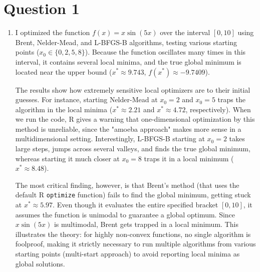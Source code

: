 \documentclass[11pt]{article}
\numberwithin{equation}{section}
\numberwithin{figure}{section}
\begin{document}
\section*{Question 1}
\begin{enumerate}
    \item[a-b)] I optimized the function $f(x) = x \sin(5x)$ over the interval $[0,10]$ using Brent, Nelder-Mead, and L-BFGS-B algorithms, testing various starting points ($x_0 \in \{0, 2, 5, 8\}$). Because the function oscillates many times in this interval, it contains several local minima, and the true global minimum is located near the upper bound ($x^* \approx 9.743$, $f(x^*) \approx -9.7409$). 
    
    The results show how extremely sensitive local optimizers are to their initial guesses. For instance, starting Nelder-Mead at $x_0=2$ and $x_0=5$ traps the algorithm in the local minima ($x^* \approx 2.21$ and $x^* \approx 4.72$, respectively). When we run the code, R gives a warning that one-dimensional optimization by this method is unreliable, since the "amoeba approach" makes more sense in a multidimensional setting. Interestingly, L-BFGS-B starting at $x_0=2$ takes large steps, jumps across several valleys, and finds the true global minimum, whereas starting it much closer at $x_0=8$ traps it in a local minimum ($x^* \approx 8.48$). 
    
    The most critical finding, however, is that Brent's method (that uses the default R \texttt{optimize} function) fails to find the global minimum, getting stuck at $x^* \approx 5.97$. Even though it evaluates the entire specified bracket $[0,10]$, it assumes the function is unimodal to guarantee a global optimum. Since $x \sin(5x)$ is multimodal, Brent  gets trapped in a local minimum. This illustrates the theory: for highly non-convex functions, no single algorithm is foolproof, making it strictly necessary to run multiple algorithms from various starting points (multi-start approach) to avoid reporting local minima as global solutions. 
\end{enumerate}
\end{document}
